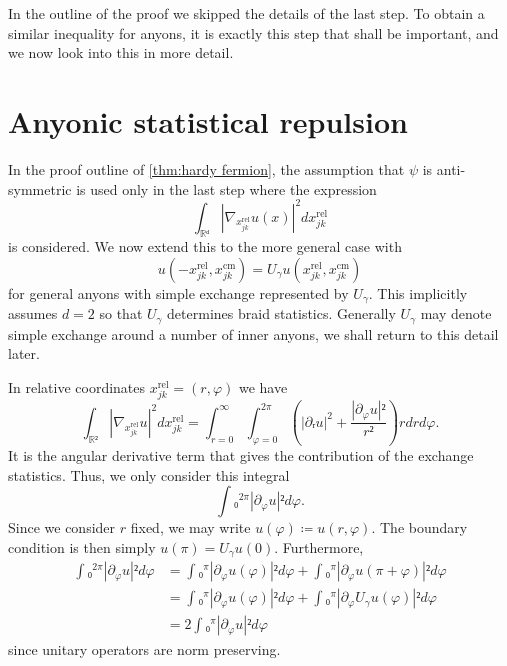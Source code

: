 In the outline of the proof we skipped the details of the last step. To obtain a similar inequality for anyons, it is exactly this step that shall be important, and we now look into this in more detail.














\section{Anyonic statistical repulsion}

In the proof outline of \cref{thm:hardy fermion}, the assumption that $ψ$ is anti-symmetric is used only in the last step where the expression
\begin{equation}
  ∫_{ℝᵈ} \left|∇_{x_{jk}^\text{rel}} u(x) \right|^2 dx_{jk}^\text{rel}
\end{equation}
is considered. We now extend this to the more general case with
\begin{equation}
  u(-x_{jk}^\text{rel}, x_{jk}^\text{cm}) = U_γ u(x_{jk}^\text{rel}, x_{jk}^\text{cm})
\end{equation}
for general anyons with simple exchange represented by $U_γ$. This implicitly assumes $d = 2$ so that $U_γ$ determines braid statistics. Generally $U_γ$ may denote simple exchange around a number of inner anyons, we shall return to this detail later.

In relative coordinates $x_{jk}^\text{rel} = (r, φ)$ we have
\begin{equation}
  ∫_{ℝ²} \left|∇_{x_{jk}^\text{rel}} u \right|^2 dx_{jk}^\text{rel} =
  ∫_{r=0}^∞ ∫_{φ=0}^{2π} \left( \left|∂ᵣu\right|^2 + \frac{\left|∂_φu\right|²}{r²} \right) r dr dφ.
\end{equation}
It is the angular derivative term that gives the contribution of the exchange statistics. Thus, we only consider this integral
\begin{equation}
  ∫₀^{2π} \left|∂_φu\right|² dφ.
\end{equation}
Since we consider $r$ fixed, we may write $u(φ) ≔ u(r,φ)$. The boundary condition is then simply $u(π) = U_γ u(0)$. Furthermore,
\begin{equation}
  \begin{aligned}
    ∫₀^{2π} \left|∂_φu\right|² dφ
    &=
    ∫₀^π \left|∂_φu(φ)\right|² dφ +
    ∫₀^π \left|∂_φu(π+φ)\right|² dφ \\
    &=
    ∫₀^π \left|∂_φu(φ)\right|² dφ +
    ∫₀^π \left|∂_φU_γu(φ)\right|² dφ \\
    &=
    2∫₀^π \left|∂_φu\right|² dφ
  \end{aligned}
\end{equation}
since unitary operators are norm preserving.

